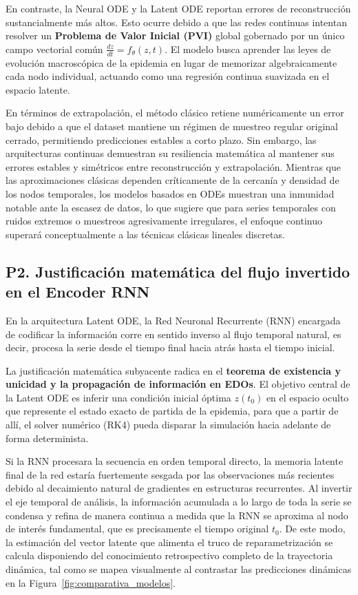 \documentclass[11pt,a4paper]{article}
\begin{document}
En contraste, la Neural ODE y la Latent ODE reportan errores de reconstrucción sustancialmente más altos. Esto ocurre debido a que las redes continuas intentan resolver un \textbf{Problema de Valor Inicial (PVI)} global gobernado por un único campo vectorial común $\frac{dz}{dt} = f_\theta(z, t)$. El modelo busca aprender las leyes de evolución macroscópica de la epidemia en lugar de memorizar algebraicamente cada nodo individual, actuando como una regresión continua suavizada en el espacio latente. 

En términos de extrapolación, el método clásico retiene numéricamente un error bajo debido a que el dataset mantiene un régimen de muestreo regular original cerrado, permitiendo predicciones estables a corto plazo. Sin embargo, las arquitecturas continuas demuestran su resiliencia matemática al mantener sus errores estables y simétricos entre reconstrucción y extrapolación. Mientras que las aproximaciones clásicas dependen críticamente de la cercanía y densidad de los nodos temporales, los modelos basados en ODEs muestran una inmunidad notable ante la escasez de datos, lo que sugiere que para series temporales con ruidos extremos o muestreos agresivamente irregulares, el enfoque continuo superará conceptualmente a las técnicas clásicas lineales discretas.

\subsection*{P2. Justificación matemática del flujo invertido en el Encoder RNN}
En la arquitectura Latent ODE, la Red Neuronal Recurrente (RNN) encargada de codificar la información corre en sentido inverso al flujo temporal natural, es decir, procesa la serie desde el tiempo final hacia atrás hasta el tiempo inicial. 

La justificación matemática subyacente radica en el \textbf{teorema de existencia y unicidad y la propagación de información en EDOs}. El objetivo central de la Latent ODE es inferir una condición inicial óptima $z(t_0)$ en el espacio oculto que represente el estado exacto de partida de la epidemia, para que a partir de allí, el solver numérico (RK4) pueda disparar la simulación hacia adelante de forma determinista. 

Si la RNN procesara la secuencia en orden temporal directo, la memoria latente final de la red estaría fuertemente sesgada por las observaciones más recientes debido al decaimiento natural de gradientes en estructuras recurrentes. Al invertir el eje temporal de análisis, la información acumulada a lo largo de toda la serie se condensa y refina de manera continua a medida que la RNN se aproxima al nodo de interés fundamental, que es precisamente el tiempo original $t_0$. De este modo, la estimación del vector latente que alimenta el truco de reparametrización se calcula disponiendo del conocimiento retrospectivo completo de la trayectoria dinámica, tal como se mapea visualmente al contrastar las predicciones dinámicas en la Figura~\ref{fig:comparativa_modelos}.
\end{document}
